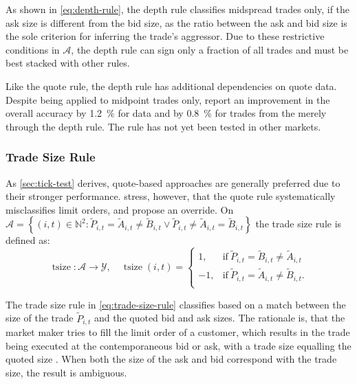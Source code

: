 As shown in \cref{eq:depth-rule}, the depth rule classifies midspread trades only, if the ask size is different from the bid size, as the ratio between the ask and bid size is the sole criterion for inferring the trade's aggressor. Due to these restrictive conditions in $\mathcal{A}$, the depth rule can sign only a fraction of all trades and must be best stacked with other rules.

Like the quote rule, the depth rule has additional dependencies on quote data. Despite being applied to midpoint trades only, \textcite[][4]{grauerOptionTradeClassification2022} report an improvement in the overall accuracy by \SI{1.2}{\percent} for  data and by \SI{0.8}{\percent} for trades from the  merely through the depth rule. The rule has not yet been tested in other markets.

\subsubsection{Trade Size Rule}\label{sec:trade-size-rule}

As \cref{sec:tick-test} derives, quote-based approaches are generally preferred due to their stronger performance. \textcite[][13]{grauerOptionTradeClassification2022} stress, however, that the quote rule systematically misclassifies limit orders, and propose an override. On $\mathcal{A} = \left\{(i, t) \in \mathbb{N}^2: \tilde{P}_{i,t} = \tilde{A}_{i,t} \neq \tilde{B}_{i,t} \lor \tilde{P}_{i,t} \neq\tilde{A}_{i,t} = \tilde{B}_{i,t} \right\}$ the trade size rule is defined as:
\begin{equation}
    \operatorname{tsize} \colon \mathcal{A} \to \mathcal{Y},\quad
    \operatorname{tsize}(i, t)=
    \begin{cases}
        1,  & \text{if}\ \tilde{P}_{i, t} = \tilde{B}_{i, t} \neq \tilde{A}_{i, t}  \\
        -1, & \text{if}\ \tilde{P}_{i, t} = \tilde{A}_{i, t} \neq \tilde{B}_{i, t}. \\
    \end{cases}
    \label{eq:trade-size-rule}
\end{equation}

The trade size rule in \cref{eq:trade-size-rule} classifies based on a match between the size of the trade $\tilde{P}_{i, t}$ and the quoted bid and ask sizes. The rationale is, that the market maker tries to fill the limit order of a customer, which results in the trade being executed at the contemporaneous bid or ask, with a trade size equalling the quoted size \autocite[][13]{grauerOptionTradeClassification2022}. When both the size of the ask and bid correspond with the trade size, the result is ambiguous.

